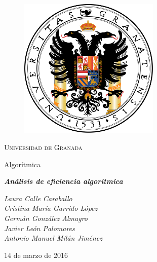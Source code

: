 \documentclass[11pt,a4paper]{article}
\begin{document}
	\begin{titlepage}

		\centering

		\begin{figure}[h]

			\centering
			\includegraphics[width=0.6\textwidth]{logo-ugr.png}
			
		\end{figure}

		\vspace{1cm}

		{\scshape\LARGE Universidad de Granada}

		\vspace{1cm}

		{\LARGE Algorítmica}

		\vspace{1cm}

		{\huge\bfseries\textit{Análisis de eficiencia algorítmica}}

		\vspace{1cm}

		{\itshape\large 
		Laura Calle Caraballo \\
		Cristina María Garrido López \\
		Germán González Almagro \\
		Javier León Palomares \\
		Antonio Manuel Milán Jiménez}

		\vfill

		{\Large 14 de marzo de 2016}

	\end{titlepage}

\newpage

	\tableofcontents

\newpage
\end{document}
